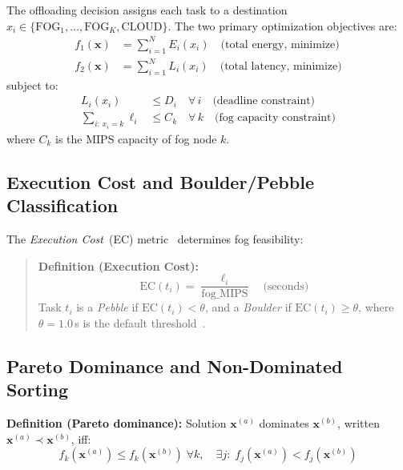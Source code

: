\documentclass[12pt,a4paper]{article}
\begin{document}
The offloading decision assigns each task to a destination
$x_i \in \{\text{FOG}_1, \ldots, \text{FOG}_K, \text{CLOUD}\}$.
The two primary optimization objectives are:
\begin{align}
  f_1(\mathbf{x}) &= \sum_{i=1}^{N} E_i(x_i)
    \quad \text{(total energy, minimize)} \label{eq:energy}\\
  f_2(\mathbf{x}) &= \sum_{i=1}^{N} L_i(x_i)
    \quad \text{(total latency, minimize)} \label{eq:latency}
\end{align}
subject to:
\begin{align}
  L_i(x_i) &\leq D_i \quad \forall\, i
    \quad \text{(deadline constraint)} \\
  \sum_{i:\,x_i = k} \ell_i &\leq C_k \quad \forall\, k
    \quad \text{(fog capacity constraint)}
\end{align}
where $C_k$ is the MIPS capacity of fog node $k$.

\subsection{Execution Cost and Boulder/Pebble Classification}

The \emph{Execution Cost}~(EC) metric~\cite{nouri2024tof} determines fog
feasibility:
\begin{quote}
\textbf{Definition (Execution Cost):}
\begin{equation}
  \mathrm{EC}(t_i) = \frac{\ell_i}{\text{fog\_MIPS}} \quad\text{(seconds)}
  \label{eq:ec}
\end{equation}
Task $t_i$ is a \emph{Pebble} if $\mathrm{EC}(t_i) < \theta$, and a
\emph{Boulder} if $\mathrm{EC}(t_i) \geq \theta$, where $\theta = 1.0$\,s
is the default threshold~\cite{nouri2024tof}.
\end{quote}


\subsection{Pareto Dominance and Non-Dominated Sorting}

\textbf{Definition (Pareto dominance):}
Solution $\mathbf{x}^{(a)}$ dominates $\mathbf{x}^{(b)}$, written
$\mathbf{x}^{(a)} \prec \mathbf{x}^{(b)}$, iff:
\begin{equation}
  f_k\!\left(\mathbf{x}^{(a)}\right) \leq f_k\!\left(\mathbf{x}^{(b)}\right)\;
  \forall k,\quad
  \exists j:\; f_j\!\left(\mathbf{x}^{(a)}\right) < f_j\!\left(\mathbf{x}^{(b)}\right)
\end{equation}
\end{document}
